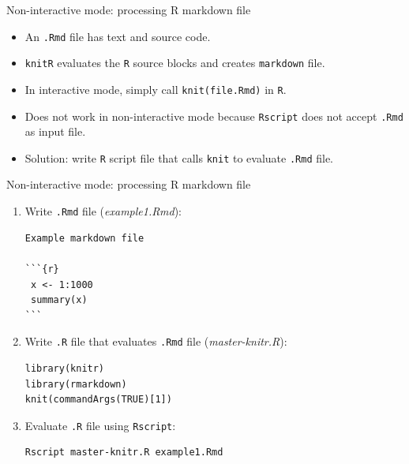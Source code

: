 \documentclass[12pt,t,xcolor=table]{beamer}
\begin{document}
\begin{frame}[fragile,label={sec:orgheadline18}]{Non-interactive mode: processing R markdown file}
 \vspace{0.5em}

\begin{itemize}
\item An \texttt{.Rmd} file has text and source code.\setlength\itemsep{0.5em}

\item \texttt{knitR} evaluates the \texttt{R} source blocks and creates \texttt{markdown} file.

\item In interactive mode, simply call \texttt{knit(file.Rmd)} in \texttt{R}.

\item Does not work in non-interactive mode because \texttt{Rscript} does not accept \texttt{.Rmd} as input file.

\item Solution: write \texttt{R} script file that calls \texttt{knit} to evaluate \texttt{.Rmd} file.
\end{itemize}
\end{frame}

\begin{frame}[fragile,label={sec:orgheadline19}]{Non-interactive mode: processing R markdown file}
 \begin{enumerate}
\item Write \texttt{.Rmd} file (\emph{example1.Rmd}): \setlength\itemsep{0.5em}

\begin{verbatim}
Example markdown file

```{r}
 x <- 1:1000
 summary(x)
```
\end{verbatim}

\item Write \texttt{.R} file that evaluates \texttt{.Rmd} file (\emph{master-knitr.R}):

\begin{verbatim}
library(knitr)
library(rmarkdown)
knit(commandArgs(TRUE)[1])
\end{verbatim}

\item Evaluate \texttt{.R} file using \texttt{Rscript}: 

\begin{verbatim}
Rscript master-knitr.R example1.Rmd
\end{verbatim}
\end{enumerate}
\end{frame}
\end{document}
